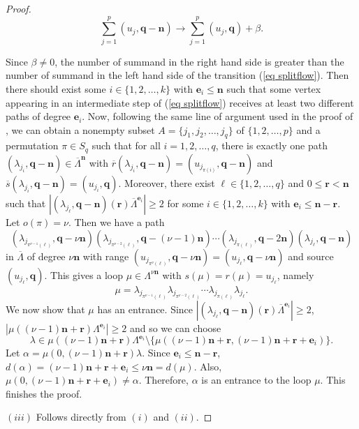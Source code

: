 \documentclass[a4paper,reqno,12pt]{amsart}
\numberwithin{equation}{section}
\theoremstyle{definition}
\theoremstyle{remark}
\newcommand{\N}{\mathbf{n}}
\begin{document}
\begin{proof}
\begin{equation}\label{eq splitflow}
\displaystyle{\sum_{j=1}^{p}} (u_j,\mathbf{q}-\N)\longrightarrow \displaystyle{\sum_{j=1}^{p}} (u_j,\mathbf{q})+\beta.    
\end{equation}

Since $\beta\neq 0$, the number of summand in the right hand side is greater than the number of summand in the left hand side of the transition (\ref{eq splitflow}). Then there should exist some $i\in \{1,2,\ldots,k\}$ with $\mathbf{e}_i\le \N$ such that some vertex appearing in an intermediate step of (\ref{eq splitflow}) receives at least two different paths of degree $\mathbf{e}_i$. Now, following the same line of argument used in the proof of \cite[Proposition 4.2 $(ii)$]{hazli}, we can obtain a nonempty subset $A=\{j_1,j_2,\ldots,j_q\}$ of $\{1,2,\ldots,p\}$ and a permutation $\pi\in S_q$ such that for all $i=1,2,\ldots,q$, there is exactly one path $(\lambda_{j_i},\mathbf{q}-\N)\in \overline{\Lambda}^{\N}$ with $\overline{r}(\lambda_{j_i},\mathbf{q}-\N)=(u_{j_{\pi(i)}},\mathbf{q}-\N)$ and $\overline{s}(\lambda_{j_i},\mathbf{q}-\N)=(u_{j_i},\mathbf{q})$. Moreover, there exist $\ell\in \{1,2,\ldots,q\}$ and $0\le \mathbf{r}<\N$ such that $|(\lambda_{j_\ell},\mathbf{q}-\N)(\mathbf{r})\overline{\Lambda}^{\mathbf{e}_i}|\ge 2$ for some $i\in \{1,2,\ldots,k\}$ with $\mathbf{e}_i\le \N-\mathbf{r}$. Let $o(\pi)=\nu$. Then we have a path \[(\lambda_{j_{\pi^{\nu-1}(\ell)}},\mathbf{q}-\nu \N)(\lambda_{j_{\pi^{\nu-2}(\ell)}},\mathbf{q}-(\nu-1) \N)\cdots (\lambda_{j_{\pi(\ell)}},\mathbf{q}-2 \N)(\lambda_{j_\ell},\mathbf{q}-\N)\] in $\overline{\Lambda}$ of degree $\nu \N$ with range $(u_{j_{\pi^\nu(\ell)}},\mathbf{q}-\nu\N)=(u_{j_\ell},\mathbf{q}-\nu \N)$ and source $(u_{j_\ell},\mathbf{q})$. This gives a loop $\mu\in \Lambda^{\nu \N}$ with $s(\mu)=r(\mu)=u_{j_\ell}$, namely \[\mu=\lambda_{j_{\pi^{\nu-1}(\ell)}}\lambda_{j_{\pi^{\nu-2}(\ell)}}\cdots \lambda_{j_{\pi(\ell)}}\lambda_{j_\ell}.\] We now show that $\mu$ has an entrance. Since $|(\lambda_{j_\ell},\mathbf{q}-\N)(\mathbf{r})\overline{\Lambda}^{\mathbf{e}_i}|\ge 2$, $|\mu((\nu-1)\N+\mathbf{r})\Lambda^{\mathbf{e}_i}|\ge 2$ and so we can choose \[\lambda\in \mu((\nu-1)\N+\mathbf{r})\Lambda^{\mathbf{e}_i}\setminus \{\mu((\nu-1)\N+\mathbf{r},(\nu-1)\N+\mathbf{r}+\mathbf{e}_i)\}.\] Let $\alpha=\mu(0,(\nu-1)\N+\mathbf{r})\lambda$. Since $\mathbf{e}_i\le \N-\mathbf{r}$, $d(\alpha)=(\nu-1)\N+\mathbf{r}+\mathbf{e}_i\le \nu\N=d(\mu)$. Also, $\mu(0,(\nu-1)\N+\mathbf{r}+\mathbf{e}_i)\neq \alpha$. Therefore, $\alpha$ is an entrance to the loop $\mu$. This finishes the proof.

$(iii)$ Follows directly from $(i)$ and $(ii)$. 
\end{proof}
\end{document}
